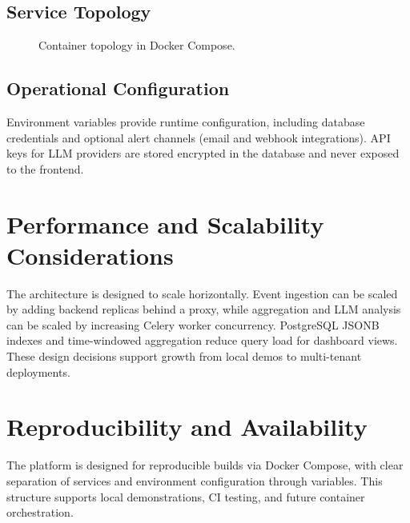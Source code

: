 \documentclass[conference]{IEEEtran}
\begin{document}
\subsection{Service Topology}
\begin{figure}[!t]
\centering
{}
\caption{Container topology in Docker Compose.}
\label{fig:compose}
\end{figure}
\FloatBarrier

\subsection{Operational Configuration}
Environment variables provide runtime configuration, including database credentials and optional alert channels (email and webhook integrations). API keys for LLM providers are stored encrypted in the database and never exposed to the frontend.

\section{Performance and Scalability Considerations}
The architecture is designed to scale horizontally. Event ingestion can be scaled by adding backend replicas behind a proxy, while aggregation and LLM analysis can be scaled by increasing Celery worker concurrency. PostgreSQL JSONB indexes and time-windowed aggregation reduce query load for dashboard views. These design decisions support growth from local demos to multi-tenant deployments.

\section{Reproducibility and Availability}
The platform is designed for reproducible builds via Docker Compose, with clear separation of services and environment configuration through variables. This structure supports local demonstrations, CI testing, and future container orchestration.
\end{document}
